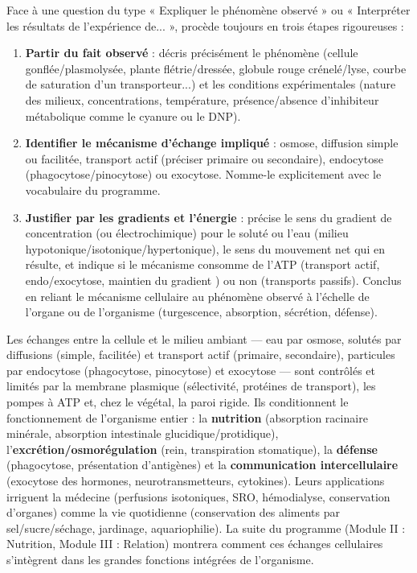 \documentclass[11pt]{article}
\begin{document}
\begin{methode}
Face à une question du type « Expliquer le phénomène observé » ou « Interpréter les résultats de l'expérience de... », procède toujours en trois étapes rigoureuses :
\begin{enumerate}
\item \textbf{Partir du fait observé} : décris précisément le phénomène (cellule gonflée/plasmolysée, plante flétrie/dressée, globule rouge crénelé/lyse, courbe de saturation d'un transporteur...) et les conditions expérimentales (nature des milieux, concentrations, température, présence/absence d'inhibiteur métabolique comme le cyanure ou le DNP).
\item \textbf{Identifier le mécanisme d'échange impliqué} : osmose, diffusion simple ou facilitée, transport actif (préciser primaire ou secondaire), endocytose (phagocytose/pinocytose) ou exocytose. Nomme-le explicitement avec le vocabulaire du programme.
\item \textbf{Justifier par les gradients et l'énergie} : précise le sens du gradient de concentration (ou électrochimique) pour le soluté ou l'eau (milieu hypotonique/isotonique/hypertonique), le sens du mouvement net qui en résulte, et indique si le mécanisme consomme de l'ATP (transport actif, endo/exocytose, maintien du gradient ) ou non (transports passifs). Conclus en reliant le mécanisme cellulaire au phénomène observé à l'échelle de l'organe ou de l'organisme (turgescence, absorption, sécrétion, défense).
\end{enumerate}
\end{methode}

\begin{aretenir}
Les échanges entre la cellule et le milieu ambiant — eau par osmose, solutés par diffusions (simple, facilitée) et transport actif (primaire, secondaire), particules par endocytose (phagocytose, pinocytose) et exocytose — sont contrôlés et limités par la membrane plasmique (sélectivité, protéines de transport), les pompes à ATP et, chez le végétal, la paroi rigide. Ils conditionnent le fonctionnement de l'organisme entier : la \textbf{nutrition} (absorption racinaire minérale, absorption intestinale glucidique/protidique), l'\textbf{excrétion/osmorégulation} (rein, transpiration stomatique), la \textbf{défense} (phagocytose, présentation d'antigènes) et la \textbf{communication intercellulaire} (exocytose des hormones, neurotransmetteurs, cytokines). Leurs applications irriguent la médecine (perfusions isotoniques, SRO, hémodialyse, conservation d'organes) comme la vie quotidienne (conservation des aliments par sel/sucre/séchage, jardinage, aquariophilie). La suite du programme (Module II : Nutrition, Module III : Relation) montrera comment ces échanges cellulaires s'intègrent dans les grandes fonctions intégrées de l'organisme.
\end{aretenir}
\end{document}

